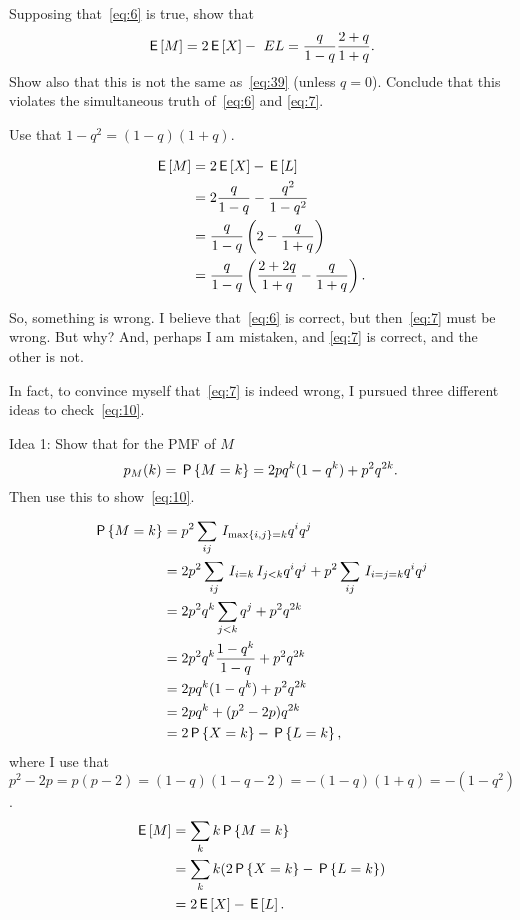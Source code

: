 \documentclass[a4paper,12pt]{article}
\begin{document}
\begin{exercise}
Supposing that~\cref{eq:6} is true, show that
\begin{equation}
  \label{eq:10}
\E M = 2\E X  -\ EL = \frac q{1-q} \frac{2+q}{1+q}.
\end{equation}
Show also that this is not the same as~\cref{eq:39} (unless $q=0$).
Conclude that this violates the simultaneous truth of~\cref{eq:6} and \cref{eq:7}.
\begin{hint}
Use that $1-q^2=(1-q)(1+q)$.
\end{hint}
\begin{solution}
  \begin{align}
    \label{eq:11}
\E M 
&= 2\E X - \E L \\
&= 2\frac q{1-q}  - \frac{q^2}{1-q^2}\\
&= \frac q{1-q}\left(2  - \frac{q}{1+q}\right)\\
&= \frac q{1-q}\left(\frac{2+2q}{1+q}  - \frac{q}{1+q}\right).
  \end{align}
\end{solution}
\end{exercise}


So, something is wrong.
I believe that~\cref{eq:6} is correct, but then~\cref{eq:7} must be wrong.
But why?
And, perhaps I am mistaken, and \cref{eq:7} is correct, and the other is not.

In fact, to convince myself that~\cref{eq:7} is indeed wrong, I pursued three different ideas to check~\cref{eq:10}.

\begin{exercise}\label{ex:1}
Idea 1: Show that for the PMF of $M$ 
\begin{equation}
  \label{eq:34}
p_M(k) = \P{M=k} = 2 pq^{k}(1-q^{k}) + p^2q^{2k}.
\end{equation}
Then use this to show~\cref{eq:10}.
\begin{solution}
  \begin{align}
    \label{eq:14}
\P{M=k}     
&=p^{2}\sum_{ij}\1{\max{i,j} =k} q^i q^j\\
&=2 p^{2}\sum_{ij}\1{i=k}\1{j < k} q^i q^j + p^{2}\sum_{ij}\1{i=j=k} q^{i} q^j \\
&=2 p^{2}q^{k}\sum_{j < k} q^j + p^{2}q^{2k}\\
&=2 p^{2}q^{k}\frac{1-q^{k}}{1-q} +  p^{2}q^{2k}\\
&=2 pq^{k}(1-q^{k}) + p^{2}q^{2k}\\
&=2 pq^{k} +(p^{2}-2p) q^{2k} \label{eq:18}\\
&=2 \P{X=k} - \P{L=k},
  \end{align}
where I use that $p^{2}-2p = p(p-2) = (1-q)(1-q-2)=-(1-q)(1+q)=-(1-q^{2})$.
  \begin{align}
    \label{eq:15}
\E M 
&= \sum_k k \P{M=k}     \\
&=  \sum_{k}k (2\P{X=k} - \P{L=k}) \\
&= 2 \E X  - \E L.
  \end{align}
\end{solution}
\end{exercise}
\end{document}
